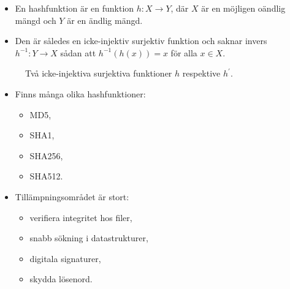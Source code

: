 \documentclass{beamer}
\theoremstyle{definition}
\begin{document}
\begin{frame}{\insertsubsectionhead}
  \begin{itemize}
    \item En hashfunktion är en funktion \(h\colon X\to Y\), där \(X\) är en 
      möjligen oändlig mängd och \(Y\) är en ändlig mängd.

    \item Den är således en icke-injektiv surjektiv funktion och saknar invers 
      \(h^{-1}\colon Y\to X\) sådan att \(h^{-1}(h(x)) = x\) för alla \(x\in 
      X\).
  \end{itemize}

  \begin{figure}
    \hspace{0.1\textwidth}
    \caption{Två icke-injektiva surjektiva funktioner \(h\) respektive 
    \(h^\prime\).}
  \end{figure}
\end{frame}

\begin{frame}{\insertsubsectionhead}
  \begin{itemize}
    \item Finns många olika hashfunktioner:
      \begin{itemize}
        \item MD5,
        \item SHA1,
        \item SHA256,
        \item SHA512.
      \end{itemize}

    \item Tillämpningsområdet är stort:
      \begin{itemize}
        \item verifiera integritet hos filer,
        \item snabb sökning i datastrukturer,
        \item digitala signaturer,
        \item skydda lösenord.
      \end{itemize}

  \end{itemize}
\end{frame}
\end{document}

